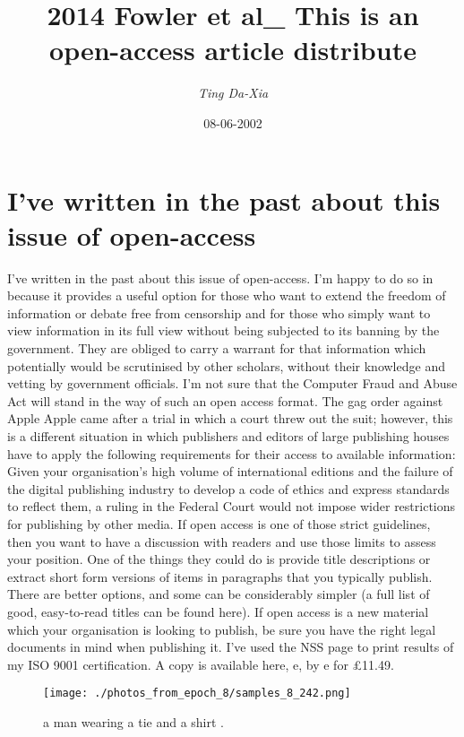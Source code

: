\documentclass{article}%
\title{2014 Fowler et al\_ This is an open{-}access article distribute}%
\author{\textit{Ting Da{-}Xia}}%
\date{08-06-2002}%
\begin{document}
%
\normalsize%
\maketitle%
\section{I’ve written in the past about this issue of open{-}access}%
\label{sec:Ivewritteninthepastaboutthisissueofopen{-}access}%
I’ve written in the past about this issue of open{-}access. I’m happy to do so in because it provides a useful option for those who want to extend the freedom of information or debate free from censorship and for those who simply want to view information in its full view without being subjected to its banning by the government. They are obliged to carry a warrant for that information which potentially would be scrutinised by other scholars, without their knowledge and vetting by government officials.\newline%
I’m not sure that the Computer Fraud and Abuse Act will stand in the way of such an open access format. The gag order against Apple Apple came after a trial in which a court threw out the suit; however, this is a different situation in which publishers and editors of large publishing houses have to apply the following requirements for their access to available information:\newline%
Given your organisation’s high volume of international editions and the failure of the digital publishing industry to develop a code of ethics and express standards to reflect them, a ruling in the Federal Court would not impose wider restrictions for publishing by other media.\newline%
If open access is one of those strict guidelines, then you want to have a discussion with readers and use those limits to assess your position. One of the things they could do is provide title descriptions or extract short form versions of items in paragraphs that you typically publish. There are better options, and some can be considerably simpler (a full list of good, easy{-}to{-}read titles can be found here).\newline%
If open access is a new material which your organisation is looking to publish, be sure you have the right legal documents in mind when publishing it. I’ve used the NSS page to print results of my ISO 9001 certification. A copy is available here, e, by e for £11.49.\newline%

%


\begin{figure}[h!]%
\centering%
\texttt{[image: ./photos\_from\_epoch\_8/samples\_8\_242.png]}%
\caption{a man wearing a tie and a shirt .}%
\end{figure}

%
\end{document}
